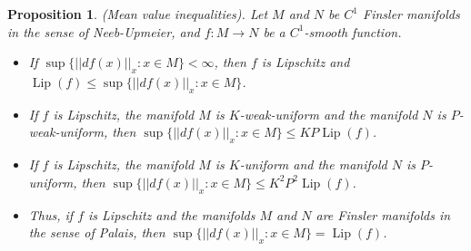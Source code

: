 \documentclass[11pt]{amsart}
\newtheorem{prop}[thm]{Proposition}
\numberwithin{equation}{section}
\begin{document}
\begin{prop}(Mean value inequalities). \label{mean:value}
Let  $M$ and $N$ be  $C^1$ Finsler manifolds in the sense of Neeb-Upmeier,  and  $f:M\to N$ be a  $C^1$-smooth function.
 \begin{itemize}
 \item[(i)]  If  $\sup\{||df(x)||_x:x\in M\}<\infty$, then $f$ is Lipschitz and  ${\operatorname{Lip}}(f)\le \sup\{||df(x)||_x:x\in M\}$.
 \item[(ii)] If $f$ is Lipschitz, the manifold $M$ is $K$-weak-uniform and the manifold $N$ is $P$-weak-uniform, then $\sup\{||df(x)||_x:x\in M\}\le KP {\operatorname{Lip}}(f)$.
 \item[(ii')] If $f$ is Lipschitz, the manifold $M$ is $K$-uniform and the manifold $N$ is $P$-uniform, then $\sup\{||df(x)||_x:x\in M\}\le K^2P^2 {\operatorname{Lip}}(f)$.
\item[(iii)] Thus, if  $f$ is Lipschitz and the manifolds $M$ and $N$ are Finsler manifolds in the sense of Palais,
 then $\sup\{||df(x)||_x:x\in M\}={\operatorname{Lip}}(f)$.
\end{itemize}
\end{prop}
\end{document}

